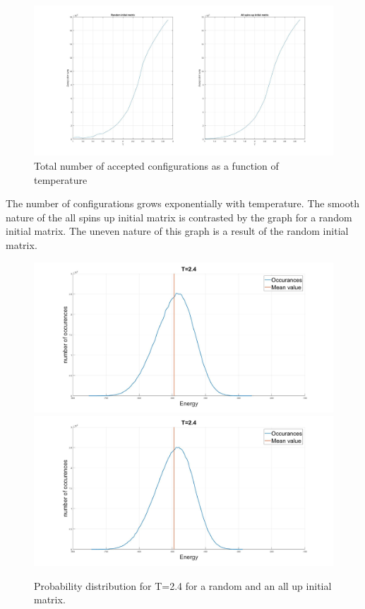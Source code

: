 \documentclass[10pt,a4paper]{article}
\begin{document}
\begin{figure} [H]
\centerline{
\includegraphics[scale=0.275]{accept.jpg}
}
\caption{Total number of accepted configurations as a function of temperature}
\label{fig:Accept}
\end{figure}
\noindent The number of configurations grows exponentially with temperature. The smooth nature of the all spins up initial matrix is contrasted by the graph for a random initial matrix. The uneven nature of this graph is a result of the random initial matrix. 


\begin{figure} [H]
\centerline{
\includegraphics[scale=0.15]{OccurancesRandom.jpg}
\includegraphics[scale=0.15]{OccurancesUp.jpg}
}
\caption{Probability distribution for T=2.4 for a random and an all up initial matrix.}
\label{fig:ProbBoth}
\end{figure}
\end{document}
